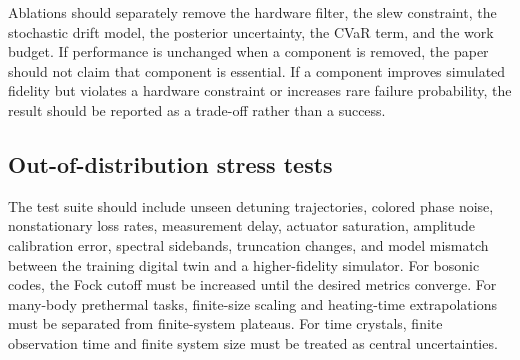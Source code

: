 \documentclass[10pt,twoside]{article}
\begin{document}
Ablations should separately remove the hardware filter, the slew constraint, the stochastic drift model, the posterior uncertainty, the CVaR term, and the work budget. If performance is unchanged when a component is removed, the paper should not claim that component is essential. If a component improves simulated fidelity but violates a hardware constraint or increases rare failure probability, the result should be reported as a trade-off rather than a success.

\subsection{Out-of-distribution stress tests}

The test suite should include unseen detuning trajectories, colored phase noise, nonstationary loss rates, measurement delay, actuator saturation, amplitude calibration error, spectral sidebands, truncation changes, and model mismatch between the training digital twin and a higher-fidelity simulator. For bosonic codes, the Fock cutoff must be increased until the desired metrics converge. For many-body prethermal tasks, finite-size scaling and heating-time extrapolations must be separated from finite-system plateaus. For time crystals, finite observation time and finite system size must be treated as central uncertainties.
\end{document}
